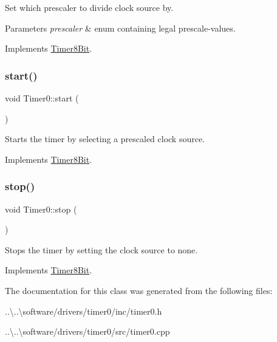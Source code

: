 Set which prescaler to divide clock source by. 
\begin{DoxyParams}{Parameters}
{\em prescaler} & enum containing legal prescale-\/values. \\
\hline
\end{DoxyParams}


Implements \mbox{\hyperlink{class_timer8_bit}{Timer8\+Bit}}.

\mbox{\label{class_timer0_a8294e4507ea1b68e090ea77a847257c2}} 
\subsubsection{\texorpdfstring{start()}{start()}}
{\footnotesize\ttfamily void Timer0\+::start (\begin{DoxyParamCaption}{ }\end{DoxyParamCaption})\hspace{0.3cm}{\ttfamily [virtual]}}

Starts the timer by selecting a prescaled clock source. 

Implements \mbox{\hyperlink{class_timer8_bit}{Timer8\+Bit}}.

\mbox{\label{class_timer0_a423cccd0c305d4e552de970b7e71fd0b}} 
\subsubsection{\texorpdfstring{stop()}{stop()}}
{\footnotesize\ttfamily void Timer0\+::stop (\begin{DoxyParamCaption}{ }\end{DoxyParamCaption})\hspace{0.3cm}{\ttfamily [virtual]}}

Stops the timer by setting the clock source to none. 

Implements \mbox{\hyperlink{class_timer8_bit}{Timer8\+Bit}}.



The documentation for this class was generated from the following files\+:\begin{DoxyCompactItemize}
\item 
..\textbackslash{}..\textbackslash{}software/drivers/timer0/inc/timer0.\+h\item 
..\textbackslash{}..\textbackslash{}software/drivers/timer0/src/timer0.\+cpp\end{DoxyCompactItemize}
